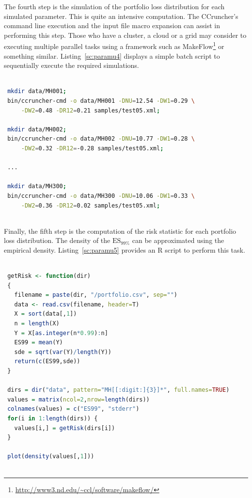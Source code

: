 \documentclass[11pt,fleqn]{book} %
\begin{document}
\begin{example}
	The fourth step is the simulation of the portfolio loss distribution
	for each simulated parameter. This is quite an intensive computation.
	The CCruncher's command line execution and the input file macro expansion
	can assist in performing this step. Those who have a cluster, a cloud or 
	a grid may consider to executing multiple parallel tasks using a framework 
	such as MakeFlow\footnote{\url{http://www3.nd.edu/~ccl/software/makeflow/}} 
	or something similar. Listing~\ref{sc:paramu4} displays a simple batch
	script to sequentially execute the required simulations.
	\begin{lstlisting}[language=bash, label={sc:paramu4}, caption={Execution of multiple CCrunchers (bash script)}]
 
 mkdir data/MH001;
 bin/ccruncher-cmd -o data/MH001 -DNU=12.54 -DW1=0.29 \
     -DW2=0.48 -DR12=0.21 samples/test05.xml; 
 
 mkdir data/MH002; 
 bin/ccruncher-cmd -o data/MH002 -DNU=10.77 -DW1=0.28 \
     -DW2=0.32 -DR12=-0.28 samples/test05.xml; 

 ...

 mkdir data/MH300; 
 bin/ccruncher-cmd -o data/MH300 -DNU=10.06 -DW1=0.33 \
     -DW2=0.36 -DR12=0.02 samples/test05.xml; 
 
	\end{lstlisting}

	Finally, the fifth step is the computation of the risk statistic
	for each portfolio loss distribution. The density of the $\text{ES}_{99\%}$ 
	can be approximated using the empirical density. Listing~\ref{sc:paramu5}
	provides an R script to perform this task. 
	\begin{lstlisting}[language=R, label={sc:paramu5}, caption={$ES_{99\%}$ distribution (R script)}]

 getRisk <- function(dir)
 {
   filename = paste(dir, "/portfolio.csv", sep="")
   data <- read.csv(filename, header=T)
   X = sort(data[,1])
   n = length(X)
   Y = X[as.integer(n*0.99):n]
   ES99 = mean(Y)
   sde = sqrt(var(Y)/length(Y))
   return(c(ES99,sde))
 }

 dirs = dir("data", pattern="MH[[:digit:]{3}]*", full.names=TRUE)
 values = matrix(ncol=2,nrow=length(dirs))
 colnames(values) = c("ES99", "stderr")
 for(i in 1:length(dirs)) {
   values[i,] = getRisk(dirs[i])
 }
 
 plot(density(values[,1]))
 

\end{lstlisting}
\end{example}
\end{document}
